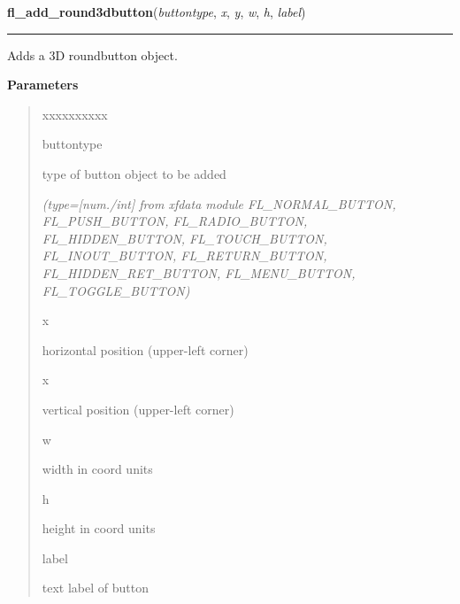     \label{xformslib:library:fl_add_round3dbutton}

    \vspace{0.5ex}

\hspace{.8\funcindent}\begin{boxedminipage}{\funcwidth}

    \raggedright \textbf{fl\_add\_round3dbutton}(\textit{buttontype}, \textit{x}, \textit{y}, \textit{w}, \textit{h}, \textit{label})

    \vspace{-1.5ex}

    \rule{\textwidth}{0.5\fboxrule}
\setlength{\parskip}{2ex}
    Adds a 3D roundbutton object.

\setlength{\parskip}{1ex}
      \textbf{Parameters}
      \vspace{-1ex}

      \begin{quote}
        \begin{Ventry}{xxxxxxxxxx}

          \item[buttontype]

          type of button object to be added

            {\it (type=[num./int] from xfdata module FL\_NORMAL\_BUTTON, FL\_PUSH\_BUTTON, 
FL\_RADIO\_BUTTON, FL\_HIDDEN\_BUTTON, FL\_TOUCH\_BUTTON, 
FL\_INOUT\_BUTTON, FL\_RETURN\_BUTTON, FL\_HIDDEN\_RET\_BUTTON, 
FL\_MENU\_BUTTON, FL\_TOGGLE\_BUTTON)}

          \item[x]

          horizontal position (upper-left corner)

          \item[x]

          vertical position (upper-left corner)

          \item[w]

          width in coord units

          \item[h]

          height in coord units

          \item[label]

          text label of button


\end{Ventry}
\end{quote}
\end{boxedminipage}

